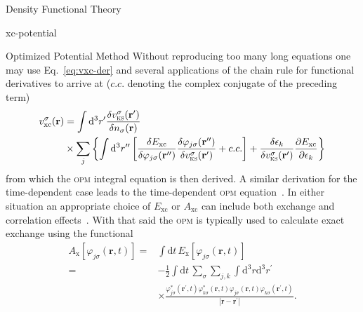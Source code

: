 \documentclass[a5paper, 9 pt]{extreport}
\begin{document}
\begin{chapter}{Density Functional Theory \label{chap:dft}}
\begin{section}{xc-potential \label{sec:xcpot}}
\begin{subsection}{Optimized Potential Method \label{sec:opm}}
         Without reproducing too many long equations one may use Eq.~\eqref{eq:vxc-der} and several
         applications of the chain rule for functional derivatives to arrive at ($c.c.$ denoting the
         complex conjugate of the preceding term)
         \begin{equation} \label{eq:opm1}
            \begin{split}
               v^\sigma_\mathrm{xc}(\mathbf{r}) & = \int \mathrm{d}^3 r^\prime
                  \frac{\delta v^\sigma_\mathrm{\textsc{ks}}(\mathbf{r^\prime})}
                       {\delta n_\sigma(\mathbf{r}) } \\
                                    & \times \sum\limits_{j} \left\{ \int \mathrm{d}^3 r^{\prime\prime}
                \left[
               \frac{\delta E_\mathrm{xc}}{\delta \varphi_{j\sigma}(\mathbf{r^{\prime\prime}}) }
               \frac{\delta \varphi_{j\sigma}(\mathbf{r^{\prime\prime}}) }
                    {\delta v^\sigma_\mathrm{\textsc{ks}}(\mathbf{r^{\prime}}) }
               + c.c.
            \right]
               + \frac{\delta \epsilon_k}{\delta v^\sigma_\mathrm{\textsc{ks}}(\mathbf{r^{\prime}})}
              \frac{\partial E_\mathrm{xc}}{\partial \epsilon_k}
            \right\}
            \end{split}
         \end{equation}
         from which the \textsc{opm} integral equation is then derived. A similar derivation for the
         time-dependent case leads to the time-dependent \textsc{opm} equation~\cite{tdopm}. In either
         situation an appropriate choice of $E_\mathrm{xc}$ or $A_\mathrm{xc}$ can include both exchange
         and correlation effects~\cite{opm5, tdopm}. With that said the \textsc{opm} is typically used
         to calculate exact exchange using the functional
         \begin{equation} \label{eq:xfunc}
            \begin{split}
               A_\mathrm{x}[\varphi_{j\sigma}(\mathbf{r},t)]
                 = & \int \mathrm{d} t \, E_\mathrm{x}[\varphi_{j\sigma}(\mathbf{r},t)] \\
                = & -\frac{1}{2} \int \mathrm{d} t \, \sum\limits_\sigma \sum\limits_{j,k}
                    \int\mathrm{d}^3 r \mathrm{d}^3 r^\prime \\
                   & \times \frac{ \varphi^*_{j\sigma}(\mathbf{r}^\prime,t)
                           \varphi^*_{k\sigma}(\mathbf{r},t)
                           \varphi_{j\sigma}(\mathbf{r},t) \varphi_{k\sigma}(\mathbf{r}^\prime,t)}
                   {\left| \mathbf{r} -\mathbf{r}^\prime \right|}.
            \end{split}
         \end{equation}


\end{subsection}
\end{section}
\end{chapter}
\end{document}
